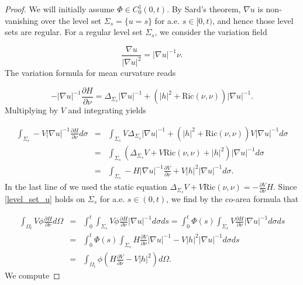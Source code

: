 \documentclass[12pt,twoside]{article}
\theoremstyle{plain}
\theoremstyle{definition}
\theoremstyle{remark}
\numberwithin{equation}{section}
\begin{document}
\begin{proof}
We will initially assume $\Phi \in C^{1}_{0}(0,t)$. By Sard's theorem, $\nabla u$ is non-vanishing over the level set $\Sigma_{s}= \{ u = s \}$ for a.e. $s \in [0,t)$, and hence those level sets are regular. For a regular level set $\Sigma_{s}$, we consider the variation field

\begin{equation*}
    \frac{\nabla u}{|\nabla u|^{2}} = |\nabla u|^{-1} \nu.
\end{equation*}
The variation formula for mean curvature reads

\begin{equation*}
    -|\nabla u|^{-1} \frac{\partial H}{\partial \nu} = \Delta_{\Sigma_{s}} |\nabla u|^{-1} + (|h|^{2} + \text{Ric}(\nu,\nu)) |\nabla u|^{-1}.
\end{equation*}
Multiplying by $V$ and integrating yields

\begin{eqnarray} \label{level_set_u}
    \int_{\Sigma_{s}} -V |\nabla u|^{-1} \frac{\partial H}{\partial \nu} d\sigma &=& \int_{\Sigma_{s}} V \Delta_{\Sigma_{s}} |\nabla u|^{-1} + (|h|^{2} + \text{Ric}(\nu,\nu)) V |\nabla u|^{-1} d\sigma \nonumber \\
    &=& \int_{\Sigma_{s}} (\Delta_{\Sigma_{s}} V + V \text{Ric}(\nu,\nu) +|h|^{2}) |\nabla u|^{-1} d\sigma \\
    &=& \int_{\Sigma_{s}} - H |\nabla u|^{-1} \frac{\partial V}{\partial \nu} + V|h|^{2} |\nabla u|^{-1} d\sigma. \nonumber 
\end{eqnarray}
In the last line of we used the static equation $\Delta_{\Sigma_{s}} V + V \text{Ric}(\nu,\nu) = - \frac{\partial V}{\partial \nu} H$. Since \eqref{level_set_u} holds on $\Sigma_{s}$ for a.e. $s \in (0,t)$, we find by the co-area formula that

\begin{eqnarray} \label{H_deriv_identity}
    \int_{\Omega_{t}} V \phi \frac{\partial H}{\partial \nu} d\Omega &=& \int_{0}^{t} \int_{\Sigma_{s}} V \phi \frac{\partial H}{\partial \nu} |\nabla u|^{-1} d\sigma ds = \int_{0}^{t} \Phi(s) \int_{\Sigma_{s}} V \frac{\partial H}{\partial \nu} |\nabla u|^{-1} d\sigma ds \nonumber \\
    &=& \int_{0}^{t} \Phi(s) \int_{\Sigma_{s}} H \frac{\partial V}{\partial \nu} |\nabla u|^{-1} - V|h|^{2} |\nabla u|^{-1} d\sigma ds \\
    &=& \int_{\Omega_{t}} \phi (H \frac{\partial V}{\partial \nu} - V|h|^{2}) d\Omega. \nonumber
\end{eqnarray}
We compute


\end{proof}
\end{document}
